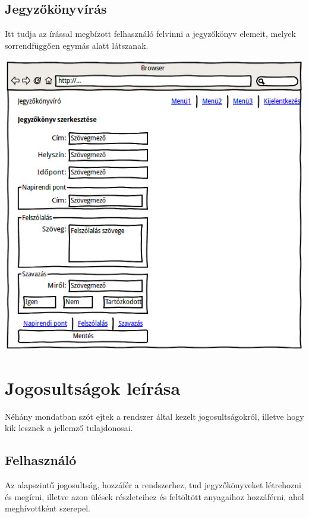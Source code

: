 \documentclass[a4paper,12pt,oneside]{report}
\begin{document}
\subsection{Jegyzőkönyvírás}

Itt tudja az írással megbízott felhasználó felvinni a jegyzőkönyv elemeit, melyek sorrendfüggően egymás alatt látszanak.

\includegraphics[width=\textwidth]{wireframe-jegyzokonyvszerkesztes}

\section{Jogosultságok leírása}

Néhány mondatban szót ejtek a rendszer által kezelt jogosultságokról, illetve hogy kik lesznek a jellemző tulajdonosai.

\subsection*{Felhasználó}

Az alapszintű jogosultság, hozzáfér a rendszerhez, tud jegyzőkönyveket létrehozni és megírni, illetve azon ülések részleteihez és feltöltött anyagaihoz hozzáférni, ahol meghívottként szerepel.
\end{document}

